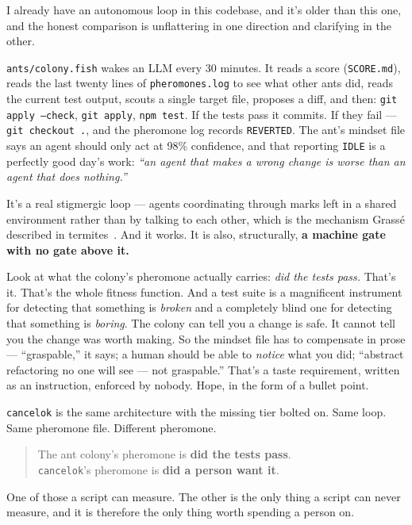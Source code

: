 \documentclass[10pt,letterpaper,twocolumn]{article}
\begin{document}
I already have an autonomous loop in this codebase, and it's older than this one, and the honest comparison is unflattering in one direction and clarifying in the other.

\texttt{ants/colony.fish} wakes an LLM every 30 minutes. It reads a score (\texttt{SCORE.md}), reads the last twenty lines of \texttt{pheromones.log} to see what other ants did, reads the current test output, scouts a single target file, proposes a diff, and then: \texttt{git apply --check}, \texttt{git apply}, \texttt{npm test}. If the tests pass it commits. If they fail --- \texttt{git checkout .}, and the pheromone log records \texttt{REVERTED}. The ant's mindset file says an agent should only act at 98\% confidence, and that reporting \texttt{IDLE} is a perfectly good day's work: \emph{``an agent that makes a wrong change is worse than an agent that does nothing.''}

It's a real stigmergic loop --- agents coordinating through marks left in a shared environment rather than by talking to each other, which is the mechanism Grassé described in termites~\citep{grasse1959}. And it works. It is also, structurally, \textbf{a machine gate with no gate above it.}

Look at what the colony's pheromone actually carries: \emph{did the tests pass.} That's it. That's the whole fitness function. And a test suite is a magnificent instrument for detecting that something is \emph{broken} and a completely blind one for detecting that something is \emph{boring}. The colony can tell you a change is safe. It cannot tell you the change was worth making. So the mindset file has to compensate in prose --- ``graspable,'' it says; a human should be able to \emph{notice} what you did; ``abstract refactoring no one will see --- not graspable.'' That's a taste requirement, written as an instruction, enforced by nobody. Hope, in the form of a bullet point.

\texttt{cancelok} is the same architecture with the missing tier bolted on. Same loop. Same pheromone file. Different pheromone.

\begin{quote}
\small The ant colony's pheromone is \textbf{did the tests pass}. \\
\texttt{cancelok}'s pheromone is \textbf{did a person want it}.
\end{quote}

One of those a script can measure. The other is the only thing a script can never measure, and it is therefore the only thing worth spending a person on.
\end{document}
